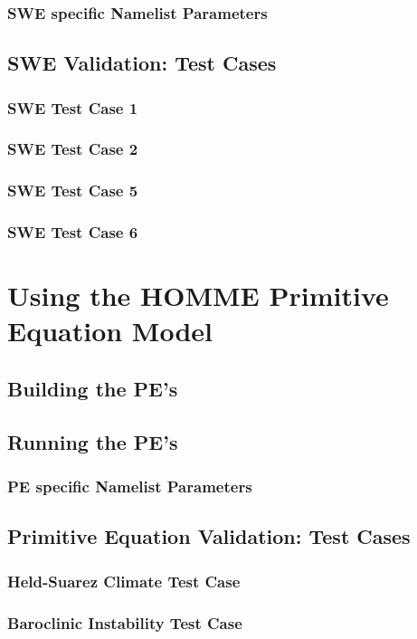 \documentclass[12pt]{article}
\numberwithin{equation}{section}
\begin{document}
\subsubsection{SWE specific Namelist Parameters}

\subsection{SWE Validation: Test Cases}					%
\subsubsection{SWE Test Case 1}
\subsubsection{SWE Test Case 2}
\subsubsection{SWE Test Case 5}
\subsubsection{SWE Test Case 6}

\section{Using the HOMME Primitive Equation Model \label{sec:PE}}
\subsection{Building the PE's}
\subsection{Running the PE's}							%
\subsubsection{PE specific Namelist Parameters}


\subsection{Primitive Equation Validation: Test Cases}		%
\subsubsection{Held-Suarez Climate Test Case}
\subsubsection{Baroclinic Instability Test Case}
\end{document}

